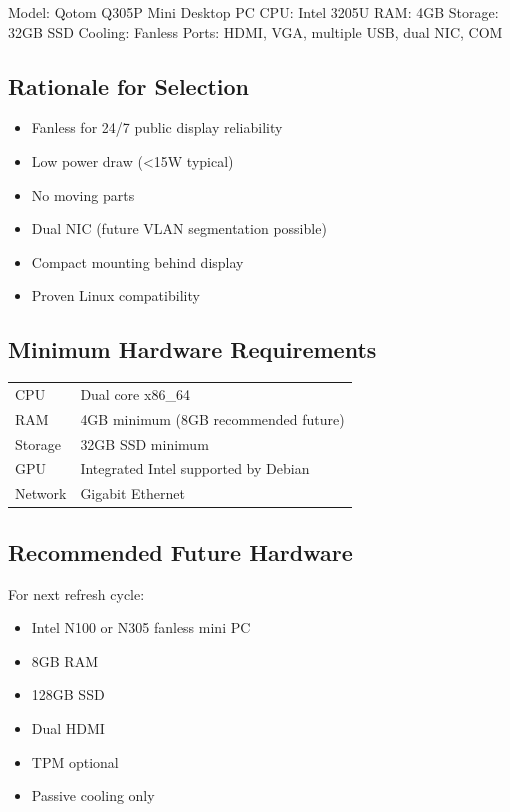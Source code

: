 \documentclass[11pt,letterpaper]{article}
\begin{document}
Model: Qotom Q305P Mini Desktop PC  
CPU: Intel 3205U  
RAM: 4GB  
Storage: 32GB SSD  
Cooling: Fanless  
Ports: HDMI, VGA, multiple USB, dual NIC, COM  

\subsection{Rationale for Selection}

\begin{itemize}
\item Fanless for 24/7 public display reliability
\item Low power draw (<15W typical)
\item No moving parts
\item Dual NIC (future VLAN segmentation possible)
\item Compact mounting behind display
\item Proven Linux compatibility
\end{itemize}

\subsection{Minimum Hardware Requirements}

\begin{longtable}{p{3in} p{2in}}
CPU & Dual core x86\_64 \\ 
RAM & 4GB minimum (8GB recommended future) \\ 
Storage & 32GB SSD minimum \\ 
GPU & Integrated Intel supported by Debian \\ 
Network & Gigabit Ethernet \\ 
\end{longtable}

\subsection{Recommended Future Hardware}

For next refresh cycle:

\begin{itemize}
\item Intel N100 or N305 fanless mini PC
\item 8GB RAM
\item 128GB SSD
\item Dual HDMI
\item TPM optional
\item Passive cooling only
\end{itemize}
\end{document}
